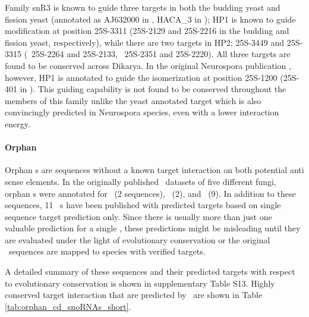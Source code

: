 Family snR3 is known  to guide three targets in
both the budding yeast and fission yeast (annotated as AJ632000 in \spo,
HACA\_3 in \snostrip); HP1 is known to guide modification at position
25S-3311 (25S-2129 and 25S-2216 in the budding and fission yeast,
respectively), while there are two targets in HP2; 25S-3449 and 25S-3315
(\sce\ 25S-2264 and 25S-2133, \spo\ 25S-2351 and 25S-2220). All three
targets are found to be conserved across Dikarya. In the original
Neurospora publication , however, HP1 is
annotated to guide the isomerization at position 25S-1200 (25S-401 in
\Ncr). This guiding capability is not found to be conserved throughout the
members of this family unlike the yeast annotated target which is also
convincingly predicted in Neurospora species, even with a lower interaction
energy.

\paragraph{\textbf{Orphan \sno}}
Orphan \sno s are sequences without a known target interaction on both
potential anti sense elements. In the originally published \sno\
datasets of five different fungi, orphan \cd s were annotated for
\sce\ (2 sequences), \ncr\ (2), and \afu\ (9). In addition to these
sequences, 11 \ncr\ \sno s have been published with predicted targets
based on single sequence target prediction only. Since there is
usually more than just one valuable prediction for a single \sno,
these predictions might be misleading until they are evaluated under
the light of evolutionary conservation or the original \sno\ sequences
are mapped to species with verified targets.

A detailed summary of these sequences and their predicted targets with
respect to evolutionary conservation is shown in supplementary Table
S13. Highly conserved target interaction that are predicted by
\snostrip\ are shown in Table \ref{tab:orphan_cd_snoRNAs_short}.

